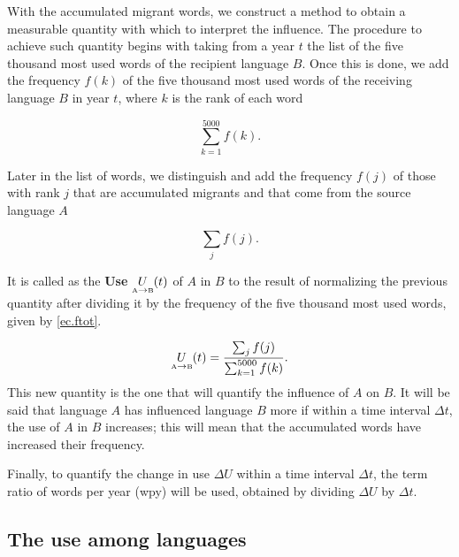\documentclass[10pt,letterpaper]{article} %
\begin{document}
With the accumulated migrant words, we construct a method to obtain a measurable quantity with which to interpret the influence. The procedure to achieve such quantity begins with taking from a year $t$ the list of the five thousand most used words of the recipient language $B$. Once this is done, we add the frequency $f(k)$ of the five thousand most used words of the receiving language $B$ in year $t$, where $k$ is the rank of each word

\begin{equation}
\label{ec.ftot}
\sum_{k=1}^{5000} f(k).
\end{equation}

Later in the list of words, we distinguish and add the frequency $f(j)$  of those with rank $j$ that are accumulated migrants and that come from the source language $A$

\begin{equation}
\label{ec.fpres}
\sum_{j} f(j).
\end{equation}

It is called as the \textbf{Use} $\underset{ \text{\tiny A} \to \text{\tiny B} }{U}(t)$ of $A$ in $B$ to the result of normalizing the previous quantity after dividing it by the frequency of the five thousand most used words, given by \ref{ec.ftot}.

\begin{equation}
\label{ec.fuso}
\underset{ \text{\tiny A} \to  \text{\tiny B} }{U}(t) = \frac{\sum_{j} f(j)}{\sum_{k=1}^{5000} f(k)}.
\end{equation}
This new quantity is the one that will quantify the influence of $A$ on $B$. It will be said that language $A$ has influenced language $B$ more if within a time interval $\Delta t$, the use of $A$ in $B$ increases; this will mean that the accumulated words have increased their frequency.

Finally, to quantify the change in use  $\Delta U$ within a time interval $\Delta t$, the term ratio of words per year (wpy) will be used, obtained by dividing $\Delta U$ by $\Delta t$.
\subsection*{The use among languages} %
\end{document}

